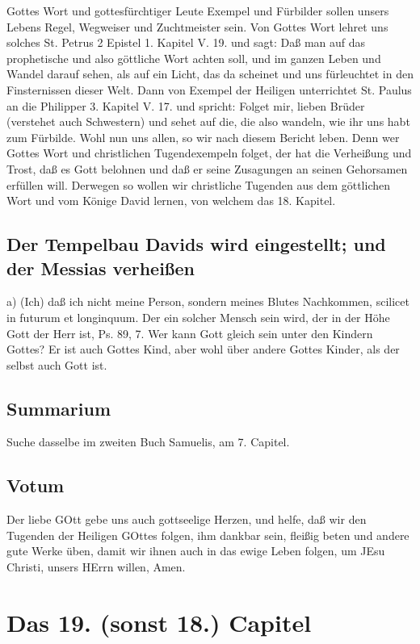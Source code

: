 Gottes Wort und gottesfürchtiger Leute Exempel und Fürbilder sollen unsers Lebens Regel, Wegweiser und Zuchtmeister sein. Von Gottes Wort lehret uns solches St. Petrus 2 Epistel 1. Kapitel V. 19. und sagt: Daß man auf das prophetische und also göttliche Wort achten soll, und im ganzen Leben und Wandel darauf sehen, als auf ein Licht, das da scheinet und uns fürleuchtet in den Finsternissen dieser Welt. Dann von Exempel der Heiligen unterrichtet St. Paulus an die Philipper 3. Kapitel V. 17. und spricht: Folget mir, lieben Brüder (verstehet auch Schwestern) und sehet auf die, die also wandeln, wie ihr uns habt zum Fürbilde. Wohl nun uns allen, so wir nach diesem Bericht leben. Denn wer Gottes Wort und christlichen Tugendexempeln folget, der hat die Verheißung und Trost, daß es Gott belohnen und daß er seine Zusagungen an seinen Gehorsamen erfüllen will. Derwegen so wollen wir christliche Tugenden aus dem göttlichen Wort und vom Könige David lernen, von welchem das 18. Kapitel.

\section[Der Tempelbau Davids wird eingestellt; und der Messias]{Der Tempelbau Davids wird eingestellt; und der Messias verheißen}

a) (Ich) daß ich nicht meine Person, sondern meines Blutes Nachkommen, scilicet in futurum et longinquum. Der ein solcher Mensch sein wird, der in der Höhe Gott der Herr ist, Ps. 89, 7. Wer kann Gott gleich sein unter den Kindern Gottes? Er ist auch Gottes Kind, aber wohl über andere Gottes Kinder, als der selbst auch Gott ist.

\section{Summarium}

Suche dasselbe im zweiten Buch Samuelis, am 7. Capitel.

\section{Votum}

Der liebe GOtt gebe uns auch gottseelige Herzen, und helfe, daß wir den Tugenden der Heiligen GOttes folgen, ihm dankbar sein, fleißig beten und andere gute Werke üben, damit wir ihnen auch in das ewige Leben folgen, um JEsu Christi, unsers HErrn willen, Amen.

\chapter{Das 19. (sonst 18.) Capitel}

